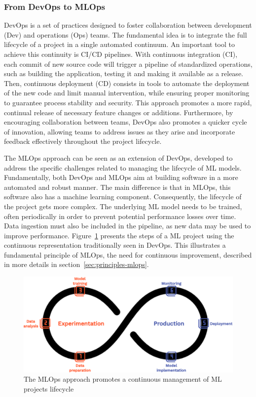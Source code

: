 \subsubsection{From DevOps to MLOps}

DevOps is a set of practices designed to foster collaboration between development (Dev) and operations (Ops) teams. The fundamental idea is to integrate the full lifecycle of a project in a single automated continuum. An important tool to achieve this continuity is CI/CD pipelines. With continuous integration (CI), each commit of new source code will trigger a pipeline of standardized operations, such as building the application, testing it and making it available as a release. Then, continuous deployment (CD) consists in tools to automate the deployment of the new code and limit manual intervention, while ensuring proper monitoring to guarantee process stability and security. This approach promotes a more rapid, continual release of necessary feature changes or additions. Furthermore, by encouraging collaboration between teams, DevOps also promotes a quicker cycle of innovation, allowing teams to address issues as they arise and incorporate feedback effectively throughout the project lifecycle.

The MLOps approach can be seen as an extension of DevOps, developed to address the specific challenges related to managing the lifecycle of ML models. Fundamentally, both DevOps and MLOps aim at building software in a more automated and robust manner. The main difference is that in MLOps, this software also has a machine learning component. Consequently, the lifecycle of the project gets more complex. The underlying ML model needs to be trained, often periodically in order to prevent potential performance losses over time. Data ingestion must also be included in the pipeline, as new data may be used to improve performance. Figure~\ref{fig:mlops-cycle} presents the steps of a ML project using the continuous representation traditionally seen in DevOps. This illustrates a fundamental principle of MLOps, the need for continuous improvement, described in more details in section~\ref{sec:principles-mlops}.

\begin{figure}[htbp]
    \centering
    \includegraphics[width=\textwidth]{sections/img/mlops-cycle.png}
    \caption{The MLOps approach promotes a continuous management of ML projects lifecycle}
    \label{fig:mlops-cycle}
\end{figure}

